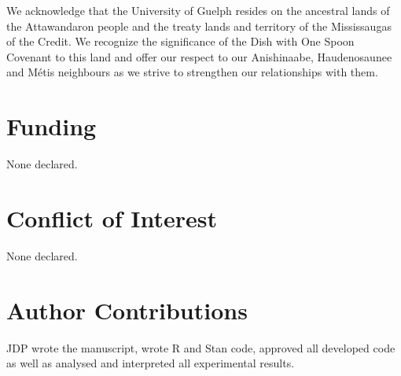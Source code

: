 \documentclass[12pt]{article}
\begin{document}
We acknowledge that the University of Guelph resides on the ancestral lands of the Attawandaron people and the treaty lands and territory of the Mississaugas of the Credit. We recognize the significance of the Dish with One Spoon Covenant to this land and offer our respect to our Anishinaabe, Haudenosaunee and M{\'e}tis neighbours as we strive to strengthen our relationships with them.

\section*{Funding}

None declared.

\section*{Conflict of Interest}

None declared.

\section*{Author Contributions}

JDP wrote the manuscript, wrote R and Stan code, approved all developed code as well as analysed and interpreted all experimental results. 



\end{document}
